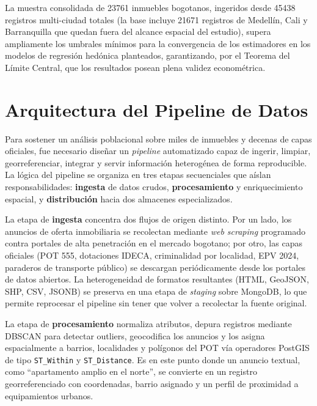 \documentclass[12pt, a4paper, twoside, openright]{report}
\theoremstyle{plain}
\theoremstyle{definition}
\begin{document}
La muestra consolidada de \num{23761} inmuebles bogotanos, ingeridos desde \num{45438} registros multi-ciudad totales (la base incluye \num{21671} registros de Medellín, Cali y Barranquilla que quedan fuera del alcance espacial del estudio), supera ampliamente los umbrales mínimos para la convergencia de los estimadores en los modelos de regresión hedónica planteados, garantizando, por el Teorema del Límite Central, que los resultados posean plena validez econométrica.

\section{Arquitectura del Pipeline de Datos}\label{sec:pipeline}

Para sostener un análisis poblacional sobre miles de inmuebles y decenas de capas oficiales, fue necesario diseñar un \emph{pipeline} automatizado capaz de ingerir, limpiar, georreferenciar, integrar y servir información heterogénea de forma reproducible. La lógica del pipeline se organiza en tres etapas secuenciales que aíslan responsabilidades: \textbf{ingesta} de datos crudos, \textbf{procesamiento} y enriquecimiento espacial, y \textbf{distribución} hacia dos almacenes especializados.

La etapa de \textbf{ingesta} concentra dos flujos de origen distinto. Por un lado, los anuncios de oferta inmobiliaria se recolectan mediante \emph{web scraping} programado contra portales de alta penetración en el mercado bogotano; por otro, las capas oficiales (POT 555, dotaciones IDECA, criminalidad por localidad, EPV 2024, paraderos de transporte público) se descargan periódicamente desde los portales de datos abiertos. La heterogeneidad de formatos resultantes (HTML, GeoJSON, SHP, CSV, JSONB) se preserva en una etapa de \emph{staging} sobre MongoDB, lo que permite reprocesar el pipeline sin tener que volver a recolectar la fuente original.

La etapa de \textbf{procesamiento} normaliza atributos, depura registros mediante DBSCAN para detectar outliers, geocodifica los anuncios y los asigna espacialmente a barrios, localidades y polígonos del POT vía operadores PostGIS de tipo \texttt{ST\_Within} y \texttt{ST\_Distance}. Es en este punto donde un anuncio textual, como ``apartamento amplio en el norte'', se convierte en un registro georreferenciado con coordenadas, barrio asignado y un perfil de proximidad a equipamientos urbanos.
\end{document}

